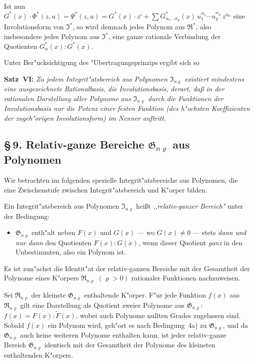 \documentclass[11pt,a4paper]{article}
\begin{document}
Ist nun
$G^{*}(x)\cdot\Phi^{*}(z,u)=\Psi^{*}(z,u)=G^{*}(x)\cdot z^{\iota}+\sum G_{\alpha_{1}\dots\alpha_{\varrho}}^{*}(x)\,u_{1}^{\alpha_{1}}\cdots u_{\varrho}^{\alpha_{\varrho}}\,z^{\alpha_{0}}$
eine Involutionsform von $\mathfrak{I}^{*}$, so wird demnach jedes Polynom aus $\mathfrak{R}^{*}$,
also insbesondere jedes Polynom aus $\mathfrak{I}^{*}$, eine ganze rationale Verbindung
der Quotienten $G_{\alpha}^{*}(x):G^{*}(x)$.

Unter Ber"{u}cksichtigung des "{U}bertragungsprinzips ergibt sich so

\medskip
\noindent
\textbf{Satz~VI:} \emph{Zu jedem Integrit"{a}tsbereich aus Polynomen $\mathfrak{I}_{n\varrho}$
existiert mindestens eine ausgezeichnete Rationalbasis, die Involutionsbasis,
derart, da\ss{} in der rationalen Darstellung aller Polynome aus $\mathfrak{I}_{n\varrho}$ durch
die Funktionen der Involutionsbasis nur die Potenz einer festen Funktion
(des h"{o}chsten Koeffizienten der zugeh"{o}rigen Involutionsform) im Nenner
auftritt.}

\subsection*{\S\,9. Relativ-ganze Bereiche $\mathfrak{G}_{n\varrho}$ aus Polynomen}

Wir betrachten im folgenden spezielle Integrit"{a}tsbereiche aus Polynomen,
die eine Zwischenstufe zwischen Integrit"{a}tsbereich und K"{o}rper bilden.

Ein Integrit"{a}tsbereich aus Polynomen $\mathfrak{I}_{n\varrho}$ hei\ss{}t \emph{,,relativ-ganzer Bereich"{}}
unter der Bedingung:
\begin{itemize}
\item[4a)] $\mathfrak{G}_{n\varrho}$ enth"{a}lt neben $F(x)$ und $G(x)$ --- wo $G(x)\neq 0$ --- stets
\emph{dann und nur dann} den Quotienten $F(x):G(x)$, wenn dieser Quotient
\emph{ganz} in den Unbestimmten, also ein Polynom ist.
\end{itemize}

Es ist zun"{a}chst die Identit"{a}t der relativ-ganzen Bereiche mit der
Gesamtheit der Polynome eines K"{o}rpers $\mathfrak{R}_{n\varrho}$ $(\varrho>0)$ rationaler Funktionen
nachzuweisen.

Sei $\mathfrak{R}_{n\varrho}$ der kleinste $\mathfrak{G}_{n\varrho}$ enthaltende K"{o}rper. F"{u}r jede Funktion $f(x)$
aus $\mathfrak{R}_{n\varrho}$ gilt eine Darstellung als Quotient zweier Polynome aus $\mathfrak{G}_{n\varrho}$:
$f(x)=F(x):\tilde{F}(x)$,
wobei auch Polynome nullten Grades zugelassen sind. Sobald $f(x)$ ein
Polynom wird, geh"{o}rt es nach Bedingung~4a) zu $\mathfrak{G}_{n\varrho}$, und da $\mathfrak{G}_{n\varrho}$ auch
keine weiteren Polynome enthalten kann, ist jeder relativ-ganze Bereich $\mathfrak{G}_{n\varrho}$
identisch mit der Gesamtheit der Polynome des kleinsten enthaltenden K"{o}rpers.
\end{document}
